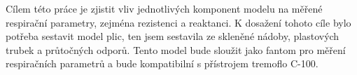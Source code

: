 Cílem této práce je zjistit vliv jednotlivých komponent modelu na měřené respirační parametry, zejména rezistenci a reaktanci. 
K dosažení tohoto cíle bylo potřeba sestavit model plic, ten jsem sestavila ze skleněné nádoby, plastových trubek a průtočných odporů. Tento model bude sloužit jako fantom pro měření respiračních parametrů a bude kompatibilní s přístrojem tremoflo C-100.
